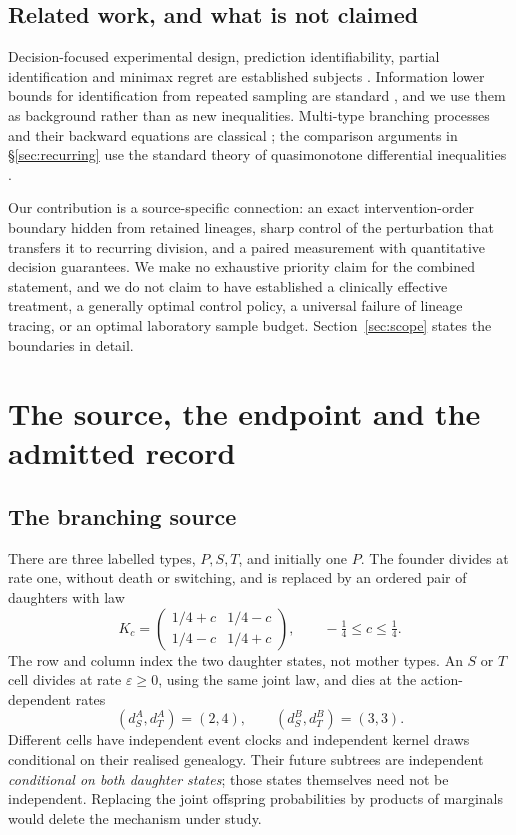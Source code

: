 \documentclass[11pt]{article}
\theoremstyle{plain}
\theoremstyle{definition}
\theoremstyle{remark}
\newcommand{\eps}{\varepsilon}
\begin{document}
\subsection{Related work, and what is not claimed}

Decision-focused experimental design, prediction identifiability, partial
identification and minimax regret are established subjects
\citep{Flassig2015,Manski2004,Stoye2012}. Information lower bounds for
identification from repeated sampling are standard
\citep{KaufmannCappeGarivier2016,Tsybakov2009}, and we use them as background
rather than as new inequalities. Multi-type branching processes and their
backward equations are classical
\citep{Harris1963,AthreyaNey1972,KimmelAxelrod2015}; the comparison arguments in
\S\ref{sec:recurring} use the standard theory of quasimonotone differential
inequalities \citep{Walter1970,Walter1998,Smith1995}.

Our contribution is a source-specific connection: an exact intervention-order
boundary hidden from retained lineages, sharp control of the perturbation that
transfers it to recurring division, and a paired measurement with quantitative
decision guarantees. We make no exhaustive priority claim for the combined
statement, and we do not claim to have established a clinically effective
treatment, a generally optimal control policy, a universal failure of lineage
tracing, or an optimal laboratory sample budget. Section~\ref{sec:scope}
states the boundaries in detail.

\section{The source, the endpoint and the admitted record}\label{sec:source}

\subsection{The branching source}

There are three labelled types, $P,S,T$, and initially one $P$. The founder
divides at rate one, without death or switching, and is replaced by an ordered
pair of daughters with law
\begin{equation}\label{eq:kernel}
 K_c=\begin{pmatrix}1/4+c&1/4-c\\1/4-c&1/4+c\end{pmatrix},
 \qquad -\tfrac14\le c\le\tfrac14 .
\end{equation}
The row and column index the two daughter states, not mother types. An $S$ or
$T$ cell divides at rate $\eps\ge0$, using the same joint law, and dies at the
action-dependent rates
\begin{equation}\label{eq:rates}
 (d_S^A,d_T^A)=(2,4),\qquad (d_S^B,d_T^B)=(3,3).
\end{equation}
Different cells have independent event clocks and independent kernel draws
conditional on their realised genealogy. Their future subtrees are independent
\emph{conditional on both daughter states}; those states themselves need not be
independent. Replacing the joint offspring probabilities by products of
marginals would delete the mechanism under study.
\end{document}
